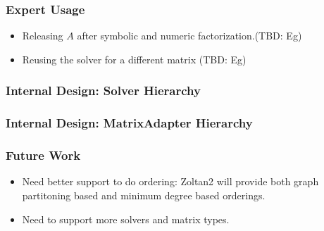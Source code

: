 \documentclass[xcolor=dvipsnames]{beamer}
\begin{document}
\begin{frame}
    \frametitle{Expert Usage}
\begin{itemize}
    \item Releasing $A$ after symbolic and numeric factorization.(TBD: Eg)
    \item Reusing the solver for a different matrix (TBD: Eg)
\end{itemize}
\end{frame}

\begin{frame}
    \frametitle{Internal Design: Solver Hierarchy}
\end{frame}

\begin{frame}
    \frametitle{Internal Design: MatrixAdapter Hierarchy}
\end{frame}

\begin{frame}
    \frametitle{Future Work}
\begin{itemize}
    \item Need better support to do ordering: Zoltan2 will provide both
    graph partitoning based and minimum degree based orderings.
    \item Need to support more solvers and matrix types.
\end{itemize}
\end{frame}
\end{document}
